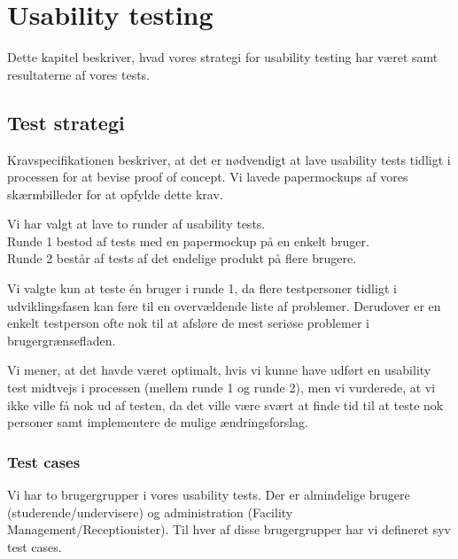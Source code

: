 \chapter{Usability testing}
\label{Usability}
Dette kapitel beskriver, hvad vores strategi for usability testing har været samt resultaterne af vores tests.

\section{Test strategi}
\label{Usability_TS}
Kravspecifikationen beskriver, at det er nødvendigt at lave usability tests tidligt i processen for at bevise proof of concept. Vi lavede papermockups af vores skærmbilleder for at opfylde dette krav. 

Vi har valgt at lave to runder af usability tests.
\\Runde 1 bestod af tests med en papermockup på en enkelt bruger.
\\Runde 2 består af tests af det endelige produkt på flere brugere.

Vi valgte kun at teste én bruger i runde 1, da flere testpersoner tidligt i udviklingsfasen kan føre til en overvældende liste af problemer\cite[s. 416]{SL_UID}. Derudover er en enkelt testperson ofte nok til at afsløre de mest seriøse problemer i brugergrænsefladen.

Vi mener, at det havde været optimalt, hvis vi kunne have udført en usability test midtvejs i processen (mellem runde 1 og runde 2), men vi vurderede, at vi ikke ville få nok ud af testen, da det ville være svært at finde tid til at teste nok personer samt implementere de mulige ændringsforslag.

\subsection{Test cases}
\label{Usability_TS_TC}
Vi har to brugergrupper i vores usability tests. Der er almindelige brugere (studerende/undervisere) og administration (Facility Management/Receptionister). Til hver af disse brugergrupper har vi defineret syv test cases.


